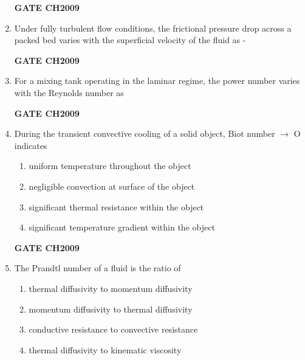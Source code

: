 \documentclass[journal,12pt,onecolumn]{IEEEtran}
\theoremstyle{remark}
\begin{document}
\begin{enumerate}
		\hfill
		\textbf{GATE CH2009} 
		
		
		
		\item Under fully turbulent flow conditions, the frictional pressure drop across a packed bed varies with the superficial velocity  of the fluid as - 
		\begin{enumerate}
		\end{enumerate} 
		
		\hfill
		\textbf{GATE CH2009} 
		
		\item For a mixing tank operating in the laminar regime, the power number varies with the Reynolds number \brak{Re} as
		\begin{enumerate}
			\begin{multicols}{4}
				\item $Re^\frac{-1}{2}$
				\item $Re^\frac{1}{2}$
				\item Re
				\item $Re^-1$
			\end{multicols}
		\end{enumerate} 
		
		\hfill
		\textbf{GATE CH2009} 
		
		\item During the transient convective cooling of a solid object, Biot number $\rightarrow$ O indicates 
		\begin{enumerate}
			\item uniform temperature throughout the object
			\item negligible convection at surface of the object
			\item significant thermal resistance within the object
			\item significant temperature gradient within the object
		\end{enumerate} 
		
		\hfill
		\textbf{GATE CH2009} 
		
		\item The Prandtl number of a fluid is the ratio of 
		\begin{enumerate}
			\item thermal diffusivity to momentum diffusivity
			\item momentum diffusivity to thermal diffusivity
			\item conductive resistance to convective resistance
			\item thermal diffusivity to kinematic viscosity
		\end{enumerate} 
		

\end{enumerate}
\end{document}

